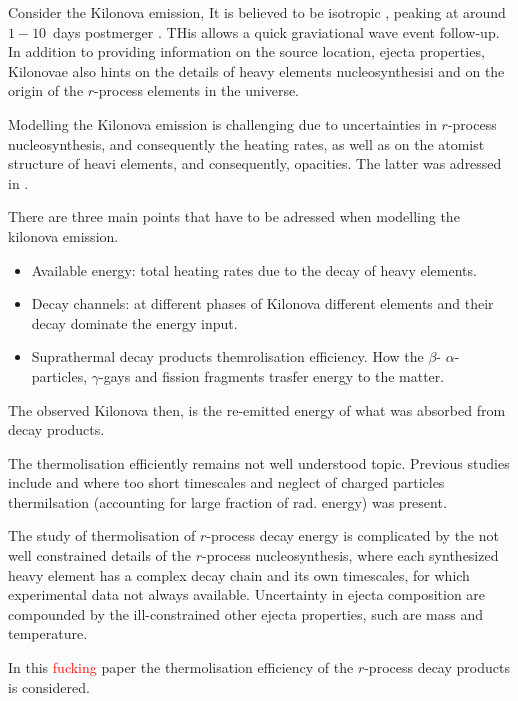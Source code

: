 \documentclass[11pt,a4paper,headinclude=true,DIV=14,BCOR=8mm,chapterprefix,listof=totoc,twoside,openright,abstracton]{scrbook}
\newcommand{\red}[1]{\textcolor{red}{#1}}
\begin{document}
Consider the Kilonova emission, It is believed to be isotropic \cite{(Roberts et al. 2011; Bauswein et al. 2013)}, peaking at around $1-10$~days postmerger \cite{(Barnes & Kasen 2013; Tanaka & Hotokezaka 2013; Grossman et al. 2014)}. THis allows a quick graviational wave event follow-up. In addition to providing information on the source location, ejecta properties, Kilonovae also hints on the details of heavy elements nucleosynthesisi and on the origin of the $r$-process elements in the universe. 

Modelling the Kilonova emission is challenging due to uncertainties in $r$-process nucleosynthesis, and consequently the heating rates, as well as on the atomist structure of heavi elements, and consequently, opacities. The latter was adressed in \cite{(Kasen et al. 2013)}.

There are three main points that have to be adressed when modelling the kilonova emission. 
\begin{itemize}
    \item Available energy: total heating rates due to the decay of heavy elements.
    \item Decay channels: at different phases of Kilonova different elements and their decay dominate the energy input.
    \item Suprathermal decay products themrolisation efficiency. How the $\beta$- $\alpha$-particles, $\gamma$-gays and fission fragments trasfer energy to the matter.
\end{itemize}
The observed Kilonova then, is the re-emitted energy of what was absorbed from decay products. 

The thermolisation efficiently remains not well understood topic. Previous studies include \cite{Metzger et al. (2010)} and \cite{Hotokezaka et al. (2016)} where too short timescales and neglect of charged particles thermilsation (accounting for large fraction of rad. energy) was present.

The study of thermolisation of $r$-process decay energy is complicated by the not well constrained details of the $r$-process nucleosynthesis, where each synthesized heavy element has a complex decay chain and its own timescales, for which experimental data not always available. Uncertainty in ejecta composition are compounded by the ill-constrained other ejecta properties, such are mass and temperature.

In this \red{fucking} paper the thermolisation efficiency of the $r$-process decay products is considered. 
\end{document}
